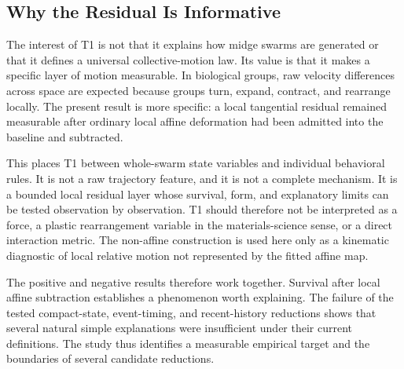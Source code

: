 \subsection{Why the Residual Is Informative}

The interest of T1 is not that it explains how midge swarms are generated or
that it defines a universal collective-motion law. Its value is that it makes
a specific layer of motion measurable. In biological groups, raw velocity
differences across space are expected because groups turn, expand, contract,
and rearrange locally. The present result is more specific: a local tangential
residual remained measurable after ordinary local affine deformation had been
admitted into the baseline and subtracted.

This places T1 between whole-swarm state variables and individual behavioral
rules. It is not a raw trajectory feature, and it is not a complete mechanism.
It is a bounded local residual layer whose survival, form, and explanatory
limits can be tested observation by observation.
T1 should therefore not be interpreted as a force, a plastic rearrangement
variable in the materials-science sense, or a direct interaction metric. The
non-affine construction is used here only as a kinematic diagnostic of local
relative motion not represented by the fitted affine map.

The positive and negative results therefore work together. Survival after
local affine subtraction establishes a phenomenon worth explaining. The failure
of the tested compact-state, event-timing, and recent-history reductions shows
that several natural simple explanations were insufficient under their current
definitions. The study thus identifies a measurable empirical target and the
boundaries of several candidate reductions.
